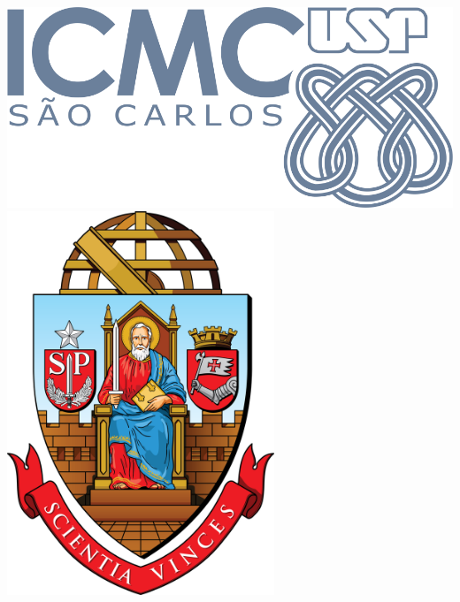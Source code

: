 \documentclass[a0,portrait]{a0poster}
\begin{document}
\begin{minipage}[b]{0.25\linewidth}
\includegraphics[width=17cm]{LOGO_ICMC_CMYK.png}
\includegraphics[width=8cm]{brasao_usp1.png}
\end{minipage}

\vspace{1cm} %

\end{document}
